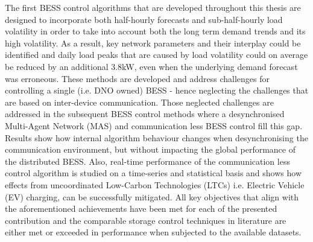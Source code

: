 
The first BESS control algorithms that are developed throughout this thesis are designed to incorporate both half-hourly forecasts and sub-half-hourly load volatility in order to take into account both the long term demand trends and its high volatility.
As a result, key network parameters and their interplay could be identified and daily load peaks that are caused by load volatility could on average be reduced by an additional 3.8kW, even when the underlying demand forecast was erroneous.
These methods are developed and address challenges for controlling a single (i.e. DNO owned) BESS - hence neglecting the challenges that are based on inter-device communication.
Those neglected challenges are addressed in the subsequent BESS control methods where a desynchronised Multi-Agent Network (MAS) and communication less BESS control fill this gap.
Results show how internal algorithm behaviour changes when desynchronising the communication environment, but without impacting the global performance of the distributed BESS.
Also, real-time performance of the communication less control algorithm is studied on a time-series and statistical basis and shows how effects from uncoordinated Low-Carbon Technologies (LTCs) i.e. Electric Vehicle (EV) charging, can be successfully mitigated.
All key objectives that align with the aforementioned achievements have been met for each of the presented contribution and the comparable storage control techniques in literature are either met or exceeded in performance when subjected to the available datasets.
 